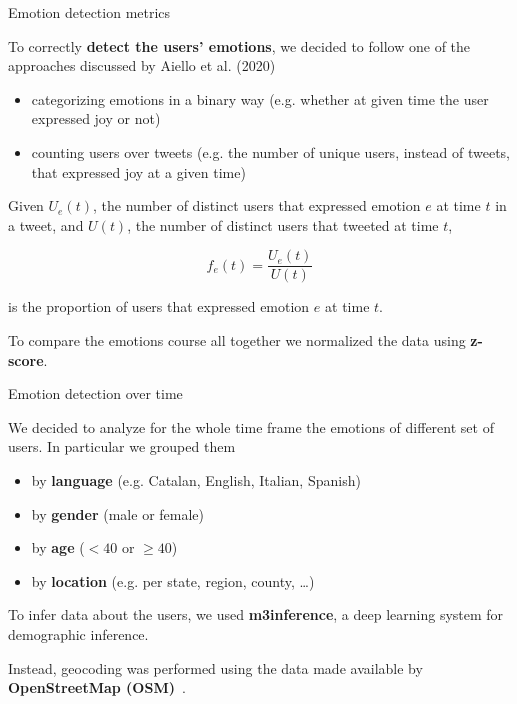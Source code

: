 \documentclass[9pt,aspectratio=1610]{beamer}  %
\begin{document}
\begin{frame}{Emotion detection metrics}

    To correctly \textbf{detect the users' emotions}, we decided to follow one of the approaches discussed by Aiello et al. (2020)~\autocite{aiello2020epidemic}
	
	\begin{itemize}
    	\item categorizing emotions in a binary way (e.g. whether at given time the user expressed joy or not)
    	\item counting users over tweets (e.g. the number of unique users, instead of tweets, that expressed joy at a given time)
    \end{itemize}
	
    \begin{definition}[1]
    \label{def:user-emotions}
    	Given \(U_e(t)\), the number of distinct users that expressed emotion \(e\) at time \(t\) in a tweet, and \(U(t)\), the number of distinct users that tweeted at time \(t\),
    	
    	\[f_e(t) = \frac{U_e(t)}{U(t)}\]
    	
    	is the proportion of users that expressed emotion \(e\) at time \(t\).	
    \end{definition}
    
    To compare the emotions course all together we normalized the data using \textbf{z-score}.

\end{frame}

\begin{frame}{Emotion detection over time}

    We decided to analyze for the whole time frame the emotions of different set of users. In particular we grouped them
    
    \begin{itemize}
        \item by \textbf{language} (e.g. Catalan, English, Italian, Spanish)
        \item by \textbf{gender} (male or female)
        \item by \textbf{age} (\(< 40\) or \(\geq 40\))
        \item by \textbf{location} (e.g. per state, region, county, \ldots)
    \end{itemize}
    
    To infer data about the users, we used \textbf{m3inference}, a deep learning system for demographic inference\autocite{wang2019demographic}.
    
    Instead, geocoding was performed using the data made available by \textbf{OpenStreetMap (OSM)}~\autocite{osm}.

\end{frame}
\end{document}
